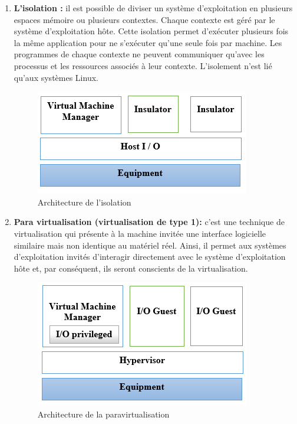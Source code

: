 \begin{enumerate}
    \item \textbf{L'isolation : }il est possible de diviser un système d'exploitation en plusieurs espaces mémoire ou plusieurs contextes. Chaque contexte est géré par le système d'exploitation hôte. Cette isolation permet d'exécuter plusieurs fois la même application pour ne s'exécuter qu'une seule fois par machine. Les programmes de chaque contexte ne peuvent communiquer qu'avec les processus et les ressources associés à leur contexte. L'isolement n'est lié qu'aux systèmes Linux.
\begin{figure}[H]
\centering
\includegraphics[scale=1]{chap1/fc1.png}
\caption{Architecture de l'isolation}
\label{fc1}
\end{figure}


\item \textbf{Para virtualisation (virtualisation de type 1):} c'est une technique de virtualisation qui présente à la machine invitée une interface logicielle similaire mais non identique au matériel réel. Ainsi, il permet aux systèmes d'exploitation invités d'interagir directement avec le système d'exploitation hôte et, par conséquent, ils seront conscients de la virtualisation.
\begin{figure}[H]
\centering
\includegraphics[scale=1]{chap1/fc2.png}
\caption{Architecture de la paravirtualisation}
\label{fc1}
\end{figure}



\end{enumerate}
